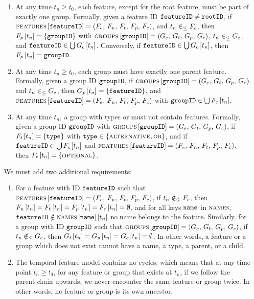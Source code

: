 \begin{enumerate}[\wf{\arabic*}, itemsep=0mm]
   \item At any time $t_n \geq t_0$, each feature, except for the root feature, must be part of exactly one group. Formally, given a feature ID $\texttt{featureID} \neq \texttt{rootID}$, if $\textsc{features} \left[ \texttt{featureID} \right] = \left(F_e,\, F_n,\, F_t,\, F_p,\, F_c\right)$, and $t_n \in_\leq F_e$, then $F_p \left[ t_n \right] = \left\{\texttt{groupID}\right\}$ with $\textsc{groups}{} \left[ \texttt{groupID} \right] = \left(G_e,\, G_t,\, G_p,\, G_c\right)$, $t_n \in_\leq G_e$, and $\texttt{featureID} \in \bigcup G_c \left[ t_n \right]$. Conversely, if $\texttt{featureID} \in \bigcup G_c \left[ t_n \right]$, then $F_p \left[ t_n \right] = \texttt{groupID}$.
   \item At any time $t_n \geq t_0$, each group must have exactly one parent feature. Formally, given a group ID $\texttt{groupID}$, if $\textsc{groups}{} \left[ \texttt{groupID} \right] = \left(G_e,\, G_t,\, G_p,\, G_c\right)$ and $t_n \in_\leq G_e$, then $G_p \left[ t_n \right] = \left\{\texttt{featureID}\right\}$, and $\textsc{features} \left[ \texttt{featureID} \right] = \left(F_e,\, F_n,\, F_t,\, F_p,\, F_c\right)$ with $\texttt{groupID} \in \bigcup F_c \left[ t_n \right]$.
   \item At any time $t_n$, a group with types \xortype{} or \ortype{} must not contain \mandatory{} features. Formally, given a group ID $\texttt{groupID}$ with $\textsc{groups}{} \left[ \texttt{groupID} \right] = \left(G_e,\, G_t,\, G_p,\, G_c\right)$, if $F_t \left[ t_n \right] = \left\{\texttt{type}\right\}$ with $\texttt{type} \in \left\{\textsc{alternative}{}, \textsc{or}{}\right\}$, and if $\texttt{featureID} \in \bigcup F_c \left[ t_n \right]$ and $\textsc{features} \left[ \texttt{featureID} \right] = \left(F_e,\, F_n,\, F_t,\, F_p,\, F_c\right)$, then $F_t \left[ t_n \right] = \left\{\textsc{optional}\right\}$.
\end{enumerate}

We must add two additional requirements:
\begin{enumerate}[itemsep=0mm]
   \item[\wf{8}] For a feature with ID $\texttt{featureID}$ such that $\textsc{features} \left[ \texttt{featureID} \right] = \left(F_e,\, F_n,\, F_t,\, F_p,\, F_c\right)$, if $t_n \notin_\leq F_e$, then $F_n \left[ t_n \right] = F_t \left[ t_n \right] = F_p \left[ t_n \right] = F_c \left[ t_n \right] = \emptyset$, and for all keys $\texttt{name}$ in $\textsc{names}$, $\texttt{featureID} \notin \textsc{names} \left[ \texttt{name} \right] \left[ t_n \right]$ \textemdash{} no name belongs to the feature. Similarly, for a group with ID $\texttt{groupID}$ such that $\textsc{groups}{} \left[ \texttt{groupID} \right] = \left(G_e,\, G_t,\, G_p,\, G_c\right)$, if $t_n \notin_\leq G_e$, then $G_t \left[ t_n \right] = G_p \left[ t_n \right] = G_c \left[ t_n \right] = \emptyset$. In other words, a feature or a group which does not exist cannot have a name, a type, a parent, or a child.
   \item[\wf{9}] The temporal feature model contains no cycles, which means that at any time point $t_n \geq t_0$, for any feature or group that exists at $t_n$, if we follow the parent chain upwards, we never encounter the same feature or group twice. In other words, no feature or group is its own ancestor.
\end{enumerate}

